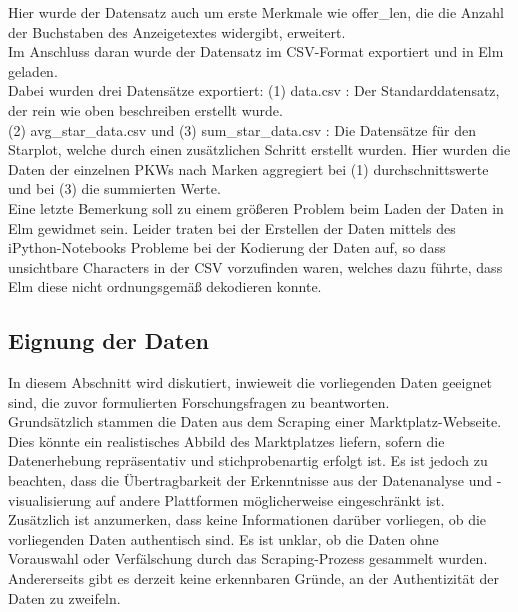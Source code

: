 Hier wurde der Datensatz auch um erste Merkmale wie offer\_len, die die Anzahl der Buchstaben des Anzeigetextes widergibt, erweitert. \\

Im Anschluss daran wurde der Datensatz im CSV-Format exportiert und in Elm geladen. \\
Dabei wurden drei Datensätze exportiert: (1)  \glqq data.csv \grqq : Der Standarddatensatz, der rein wie oben beschreiben erstellt wurde. \\
(2)  \glqq avg\_star\_data.csv \grqq  und (3)  \glqq sum\_star\_data.csv \grqq : Die Datensätze für den Starplot, welche durch einen zusätzlichen Schritt erstellt wurden. Hier wurden die Daten der einzelnen PKWs nach Marken aggregiert bei (1) durchschnittswerte und bei (3) die summierten Werte.\\
Eine letzte Bemerkung soll zu einem größeren Problem beim Laden der Daten in Elm gewidmet sein. Leider traten bei der Erstellen der Daten mittels des iPython-Notebooks Probleme bei der Kodierung der Daten auf, so dass unsichtbare Characters in der CSV vorzufinden waren, welches dazu führte, dass Elm diese nicht ordnungsgemäß dekodieren konnte. \\

\subsection{Eignung der Daten}

In diesem Abschnitt wird diskutiert, inwieweit die vorliegenden Daten geeignet sind, die zuvor formulierten Forschungsfragen zu beantworten. \\

Grundsätzlich stammen die Daten aus dem Scraping einer Marktplatz-Webseite. Dies könnte ein realistisches Abbild des Marktplatzes liefern, sofern die Datenerhebung repräsentativ und stichprobenartig erfolgt ist. Es ist jedoch zu beachten, dass die Übertragbarkeit der Erkenntnisse aus der Datenanalyse und -visualisierung auf andere Plattformen möglicherweise eingeschränkt ist. \\

Zusätzlich ist anzumerken, dass keine Informationen darüber vorliegen, ob die vorliegenden Daten authentisch sind. Es ist unklar, ob die Daten ohne Vorauswahl oder Verfälschung durch das Scraping-Prozess gesammelt wurden. Andererseits gibt es derzeit keine erkennbaren Gründe, an der Authentizität der Daten zu zweifeln. \\

